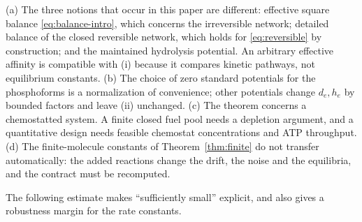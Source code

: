 \begin{remark}
(a) The three notions that occur in this paper are different: effective square balance
\eqref{eq:balance-intro}, which concerns the irreversible network; detailed balance of the
closed reversible network, which holds for \eqref{eq:reversible} by construction; and the
maintained hydrolysis potential. An arbitrary effective affinity is compatible with (i)
because it compares kinetic pathways, not equilibrium constants. (b) The choice of zero
standard potentials for the phosphoforms is a normalization of convenience; other potentials
change \(d_e,h_e\) by bounded factors and leave (ii) unchanged. (c) The theorem concerns a
chemostatted system. A finite closed fuel pool needs a depletion argument, and a quantitative
design needs feasible chemostat concentrations and ATP throughput. (d) The finite-molecule
constants of Theorem~\ref{thm:finite} do not transfer automatically: the added reactions change
the drift, the noise and the equilibria, and the contract must be recomputed.
\end{remark}

The following estimate makes ``sufficiently small'' explicit, and also gives a robustness
margin for the rate constants.

